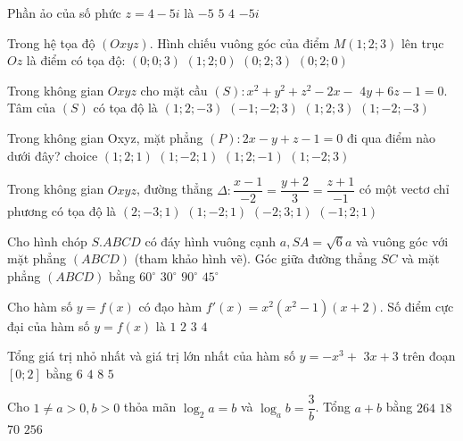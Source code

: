 \begin{ex}%
Phần ảo của số phức $z=4-5 i$ là
\choice
{\True $-5$}
{$5$}
{$4$}
{$-5 i$}

\end{ex}
\begin{ex}%
Trong hệ tọa độ $(O x y z)$. Hình chiếu vuông góc của điểm $M(1; 2; 3)$ lên trục $O z$ là điểm có tọa độ:
\choice
{\True $(0; 0; 3)$}
{$(1; 2; 0)$}
{$(0; 2; 3)$}
{$(0; 2; 0)$}

\end{ex}
\begin{ex}%
Trong không gian $O x y z$ cho mặt cầu $(S)\colon x^2+y^2+z^2-2 x-$ $4 y+6 z-1=0$. Tâm của $(S)$ có tọa độ là
\choice
{\True $(1; 2;-3)$}
{$(-1;-2; 3)$}
{$(1; 2; 3)$}
{$(1;-2;-3)$}

\end{ex}
\begin{ex}%
Trong không gian Oxyz, mặt phẳng $(P)\colon 2 x-y+z-1=0$ đi qua điểm nào dưới đây?
choice
{\True $(1; 2; 1)$}
{ $(1;-2; 1)$}
{ $(1; 2;-1)$}
{ $(1;-2; 3)$}

\end{ex}
\begin{ex}%
Trong không gian $O x y z$, đường thẳng $\Delta\colon \dfrac{x-1}{-2}=\dfrac{y+2}{3}=\dfrac{z+1}{-1}$ có một vectơ chỉ phương có tọa độ là
\choice
{\True $(2;-3; 1)$}
{$(1;-2; 1)$}
{$(-2; 3; 1)$}
{$(-1; 2; 1)$}

\end{ex}
\begin{ex}%
Cho hình chóp $S.ABCD$ có đáy hình vuông cạnh $a, SA=\sqrt{6} a$ và vuông góc với mặt phẳng $(ABCD)$ (tham khảo hình vẽ). Góc giữa đường thẳng $SC$ và mặt phẳng $(ABCD)$ bằng
\choice
{\True $60^{\circ}$}
{$30^{\circ}$}
{$90^{\circ}$}
{$45^{\circ}$}

\end{ex}
\begin{ex}%
Cho hàm số $y=f(x)$ có đạo hàm $f'(x)=x^2\left(x^2-1\right)(x+2)$. Số điểm cực đại của hàm số $y=f(x)$ là
\choice
{\True $1$}
{$2$}
{$3$}
{$4$}

\end{ex}
\begin{ex}%
Tổng giá trị nhỏ nhất và giá trị lớn nhất của hàm số $y=-x^3+$ $3 x+3$ trên đoạn $[0; 2]$ bằng
\choice
{\True $6$}
{$4$}
{$8$}
{$5$}

\end{ex}
\begin{ex}%
Cho $1\neq a>0, b>0$ thỏa mãn $\log_2 a=b$ và $\log_a b=\dfrac{3}{b}$. Tổng $a+b$ bằng
\choice
{\True $264$}
{$18$}
{$70$}
{$256$}

\end{ex}
